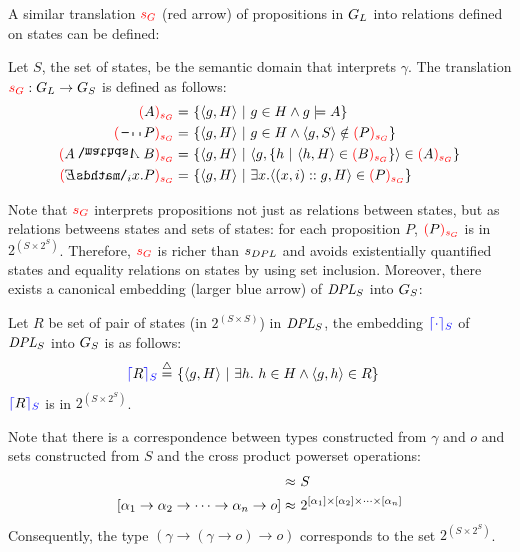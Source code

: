 \noindent A similar translation $\textcolor{red}{s_{G}}$ (red arrow) of propositions in $G_L$ into relations defined on states can be defined:
\begin{definition} Let $S$, the set of states, be the semantic domain that interprets $\gamma$. The translation $\textcolor{red}{s_{G}}: G_L \rightarrow G_S$ is defined as follows:
\begin{align*}
\mdltos{A} = \ & \{ \langle g , H \rangle \ | \ g \in H \land g \models A \} \\
\mdltos{\n2 P} = \ & \{ \langle g , H \rangle \ | \ g \in H \land \langle g, S \rangle \notin \mdltos{P} \} \\
\mdltos{A \cnj2 B} = \ & \{ \langle g , H \rangle \ | \ \langle g , \{ h \ | \ \langle h, H \rangle \in \mdltos{B} \} \rangle \in \mdltos{A} \} \\
\mdltos{\ex2_i x. P} = \ & \{ \langle g , H \rangle \ | \ \exists x. \langle (x,i)::g ,  H \rangle \in \mdltos{P} \} 
\end{align*}
\end{definition}
Note that  $\textcolor{red}{s_{G}}$ interprets propositions not just as relations between states, but as relations betweens states and sets of states: for each proposition $P$, $\textcolor{red}{(} P \textcolor{red}{)_{s_{G}}}$ is in  $2^{(S \times 2^S)}$. Therefore, $\textcolor{red}{s_{G}}$ is richer than $s_{DPL}$ and avoids existentially quantified states and equality relations on states by using set inclusion.  Moreover, there exists a canonical embedding (larger blue arrow) of $\textit{DPL}_{S}$ into $G_S$:
\begin{definition} Let $R$ be set of pair of states (in $2^{(S \times S)}$) in $\textit{DPL}_{S}$, the embedding $\textcolor{blue}{\lceil \cdot \rceil_S}$ of $\textit{DPL}_{S}$ into $G_S$ is as follows: 
\begin{align}
\textcolor{blue}{\lceil} R \textcolor{blue}{\rceil_S} \stackrel{{\scriptstyle\triangle}}{=} \ & \{  \langle g, H \rangle \ | \ \exists h. \ h \in H \land \langle g, h \rangle \in R  \} \notag
\end{align}
$\textcolor{blue}{\lceil} R \textcolor{blue}{\rceil_S}$  is in $2^{(S \times 2^S)}$.
\end{definition}
Note that there is a correspondence between types constructed from $\gamma$ and $o$ and sets constructed from $S$ and the cross product powerset operations:
\begin{align}
 [\gamma ] \approx \ & S \notag \\
 [\alpha_1 \rightarrow \alpha_2 \rightarrow  \dots \rightarrow \alpha_n \rightarrow o] \approx \ & 2^{[\alpha_1] \times [\alpha_2] \times \dots \times [\alpha_n]} \notag
\end{align}
Consequently, the type $(\gamma \rightarrow (\gamma \rightarrow o) \rightarrow o )$ corresponds to the set $2^{(S \times 2^S)}$.

